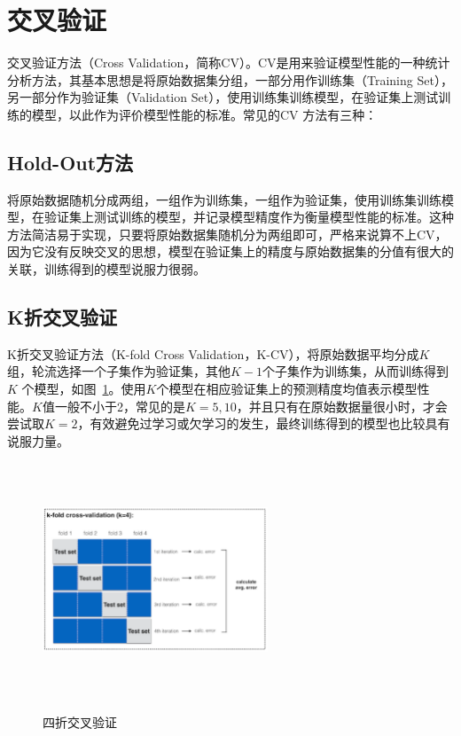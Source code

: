 \section{交叉验证}
交叉验证方法（Cross Validation，简称CV）。CV是用来验证模型性能的一种统计分析方法，其基本思想是将原始数据集分组，一部分用作训练集（Training Set），另一部分作为验证集（Validation Set），使用训练集训练模型，在验证集上测试训练的模型，以此作为评价模型性能的标准。常见的CV 方法有三种：

\subsection{Hold-Out方法}
将原始数据随机分成两组，一组作为训练集，一组作为验证集，使用训练集训练模型，在验证集上测试训练的模型，并记录模型精度作为衡量模型性能的标准。这种方法简洁易于实现，只要将原始数据集随机分为两组即可，严格来说算不上CV，因为它没有反映交叉的思想，模型在验证集上的精度与原始数据集的分值有很大的关联，训练得到的模型说服力很弱。

\subsection{K折交叉验证}
K折交叉验证方法（K-fold Cross Validation，K-CV），将原始数据平均分成$K$组，轮流选择一个子集作为验证集，其他$K-1$个子集作为训练集，从而训练得到$K$ 个模型，如图~\ref{fig:4-cv}。使用$K$个模型在相应验证集上的预测精度均值表示模型性能。$K$值一般不小于2，常见的是$K=5,10$，并且只有在原始数据量很小时，才会尝试取$K=2$，有效避免过学习或欠学习的发生，最终训练得到的模型也比较具有说服力量。
\begin{figure}[htbp]
  \centering
  \includegraphics[width=0.6\textwidth,height=7cm]{figures/4-cv.eps}\\
  \caption{四折交叉验证}\label{fig:4-cv}
\end{figure}

